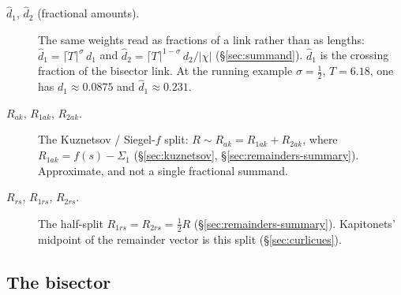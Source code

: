 \documentclass[11pt]{article}
\theoremstyle{definition}
\begin{document}
\begin{description}
\item[$\hat d_1$, $\hat d_2$ (fractional amounts).]
The same weights read as fractions of a link rather than as
lengths:
$\hat d_1=\lceil T\rceil^{\sigma}\,d_1$ and
$\hat d_2=\lceil T\rceil^{1-\sigma}\,d_2/|\chi|$
(\S\ref{sec:summand}).
$\hat d_1$ is the crossing fraction of the bisector link.
At the running example $\sigma=\tfrac12$, $T=6.18$, one has
$d_1\approx0.0875$ and $\hat d_1\approx0.231$.

\item[$R_{ak}$, $R_{1ak}$, $R_{2ak}$.]
The Kuznetsov / Siegel-$f$ split:
$R\sim R_{ak}=R_{1ak}+R_{2ak}$, where
$R_{1ak}=f(s)-\Sigma_1$
(\S\ref{sec:kuznetsov}, \S\ref{sec:remainders-summary}).
Approximate, and not a single fractional summand.

\item[$R_{rs}$, $R_{1rs}$, $R_{2rs}$.]
The half-split $R_{1rs}=R_{2rs}=\tfrac12 R$
(\S\ref{sec:remainders-summary}).
Kapitonets' midpoint of the remainder vector is this split
(\S\ref{sec:curlicues}).
\end{description}

\subsection*{The bisector}
\end{document}
